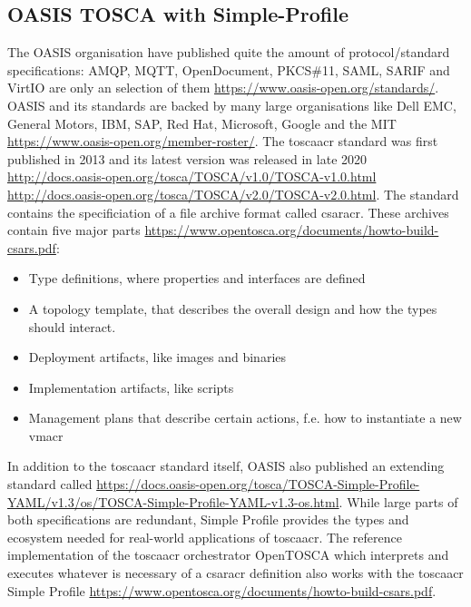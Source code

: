 \subsection{OASIS TOSCA with Simple-Profile}
The OASIS organisation have published quite the amount of protocol/standard specifications: AMQP, MQTT, OpenDocument, PKCS\#11, SAML, SARIF and VirtIO are only an selection of them \url{https://www.oasis-open.org/standards/}. OASIS and its standards are backed by many large organisations like Dell EMC, General Motors, IBM, SAP, Red Hat, Microsoft, Google and the MIT \url{https://www.oasis-open.org/member-roster/}. The \gls{toscaacr} standard was first published in 2013 and its latest version was released in late 2020 \url{http://docs.oasis-open.org/tosca/TOSCA/v1.0/TOSCA-v1.0.html} \url{http://docs.oasis-open.org/tosca/TOSCA/v2.0/TOSCA-v2.0.html}. The standard contains the specificiation of a file archive format called \gls{csaracr}. These archives contain five major parts \url{https://www.opentosca.org/documents/howto-build-csars.pdf}:
\begin{itemize}
  \item Type definitions, where properties and interfaces are defined
  \item A topology template, that describes the overall design and how the types should interact.
  \item Deployment artifacts, like images and binaries
  \item Implementation artifacts, like scripts
  \item Management plans that describe certain actions, f.e. how to instantiate a new \gls{vmacr}
\end{itemize}
In addition to the \gls{toscaacr} standard itself, OASIS also published an extending standard called  \url{https://docs.oasis-open.org/tosca/TOSCA-Simple-Profile-YAML/v1.3/os/TOSCA-Simple-Profile-YAML-v1.3-os.html}. While large parts of both specifications are redundant, Simple Profile provides the types and ecosystem needed for real-world applications of \gls{toscaacr}. The reference implementation of the \gls{toscaacr} orchestrator OpenTOSCA which interprets and executes whatever is necessary of a \gls{csaracr} definition also works with the \gls{toscaacr} Simple Profile \url{https://www.opentosca.org/documents/howto-build-csars.pdf}.

